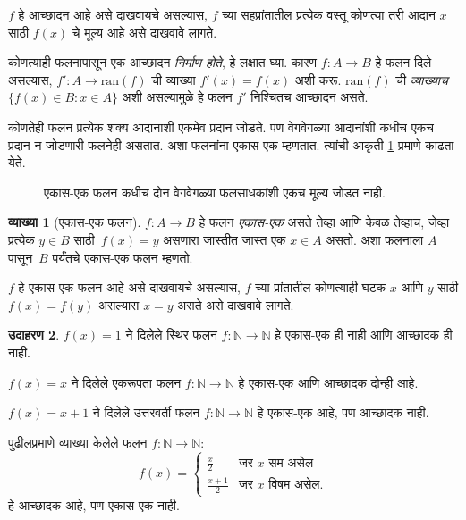 \documentclass[11pt,a4paper,openany]{book}
\theoremstyle{definition}
\newtheorem{defn}{व्याख्या}[section]
\newtheorem{ex}[defn]{उदाहरण}
\newenvironment{explain}{}{}
\newcommand{\Setabs}[2]{\{#1:#2\}}
\newcommand{\Nat}{\mathbb{N}}
\newcommand{\olasset}[2][0.52\textwidth]{\centering\resizebox{#1}{!}{}}
\newcommand{\ran}[1]{\mathrm{ran}(#1)}
\begin{document}
\begin{explain}
$f$ हे आच्छादन आहे असे दाखवायचे असल्यास, $f$ च्या सहप्रांतातील
प्रत्येक वस्तू कोणत्या तरी आदान $x$ साठी $f(x)$ चे मूल्य आहे असे दाखवावे लागते.

कोणत्याही फलनापासून एक आच्छादन \emph{निर्माण होते}, हे लक्षात घ्या.
कारण $f \colon A \to B$ हे फलन दिले असल्यास, $f' \colon A \to \ran{f}$
ची व्याख्या $f'(x) = f(x)$ अशी करू. $\ran{f}$ ची \emph{व्याख्याच}
$\Setabs{f(x) \in B}{x \in A}$ अशी असल्यामुळे हे फलन $f'$ निश्चितच
आच्छादन असते.
\end{explain}

\begin{explain}
कोणतेही फलन प्रत्येक शक्य आदानाशी एकमेव प्रदान जोडते. पण वेगवेगळ्या
आदानांशी कधीच एकच प्रदान न जोडणारी फलनेही असतात. अशा फलनांना
एकास-एक म्हणतात. त्यांची आकृती \ref{sfr:fun:kin:fig:injective} प्रमाणे काढता येते.
\begin{figure}
  \olasset{assets/diagrams/injective.tikz}
  \caption{एकास-एक फलन कधीच दोन वेगवेगळ्या फलसाधकांशी
    एकच मूल्य जोडत नाही.}
  \label{sfr:fun:kin:fig:injective}
\end{figure}
\end{explain}

\begin{defn}[एकास-एक फलन]
$f \colon A \rightarrow B$ हे फलन \emph{एकास-एक} असते तेव्हा
आणि केवळ तेव्हाच, जेव्हा प्रत्येक $y \in B$ साठी~$f(x) = y$ असणारा
जास्तीत जास्त एक $x \in A$ असतो. अशा फलनाला $A$ पासून~$B$ पर्यंतचे
एकास-एक फलन म्हणतो.
\end{defn}

\begin{explain}
$f$ हे एकास-एक फलन आहे असे दाखवायचे असल्यास, $f$ च्या प्रांतातील
कोणत्याही घटक $x$ आणि $y$ साठी $f(x)=f(y)$ असल्यास $x=y$
असते असे दाखवावे लागते.
\end{explain}

\begin{ex}
$f(x) = 1$ ने दिलेले स्थिर फलन $f\colon \Nat \to \Nat$ हे
एकास-एक ही नाही आणि आच्छादक ही नाही.

$f(x) = x$ ने दिलेले एकरूपता फलन $f\colon \Nat \to \Nat$ हे
एकास-एक आणि आच्छादक दोन्ही आहे.

$f(x) = x+1$ ने दिलेले उत्तरवर्ती फलन $f \colon \Nat \to \Nat$
हे एकास-एक आहे, पण आच्छादक नाही.

पुढीलप्रमाणे व्याख्या केलेले फलन $f \colon \Nat \to \Nat$:
\[
  f(x) =
  \begin{cases}
    \frac{x}{2} & \text{जर $x$ सम असेल} \\
    \frac{x+1}{2} & \text{जर $x$ विषम असेल.}
  \end{cases}
\]
हे आच्छादक आहे, पण एकास-एक नाही.
\end{ex}
\end{document}
